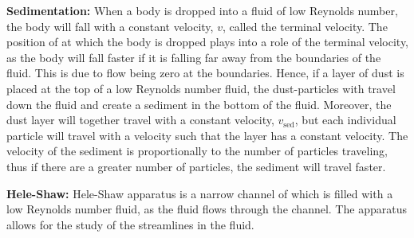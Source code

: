 \documentclass{article}
\begin{document}
\vspace{0.7cm}\noindent
\textbf{Sedimentation:} When a body is dropped into a fluid of low Reynolds number, the body will fall with a constant velocity, $v$, called the terminal velocity.
The position of at which the body is dropped plays into a role of the terminal velocity, as the body will fall faster if it is falling far away from the boundaries of the fluid.
This is due to flow being zero at the boundaries. Hence, if a layer of dust is placed at the top of a low Reynolds number fluid, the dust-particles with travel down the fluid and create a sediment in the bottom of the fluid.
Moreover, the dust layer will together travel with a constant velocity, $v_{\text{sed}}$, but each individual particle will travel with a velocity such that the layer has a constant velocity.
The velocity of the sediment is proportionally to the number of particles traveling, thus if there are a greater number of particles, the sediment will travel faster.

\vspace{0.7cm}\noindent
\textbf{Hele-Shaw:} Hele-Shaw apparatus is a narrow channel of which is filled with a low Reynolds number fluid, as the fluid flows through the channel. The apparatus allows for the study of the streamlines in the fluid.
\end{document}
